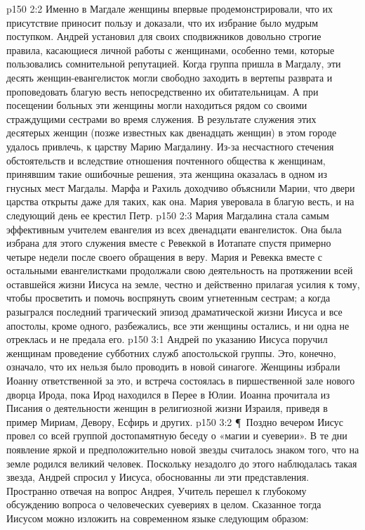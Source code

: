 \vs p150 2:2 Именно в Магдале женщины впервые продемонстрировали, что их присутствие приносит пользу и доказали, что их избрание было мудрым поступком. Андрей установил для своих сподвижников довольно строгие правила, касающиеся личной работы с женщинами, особенно теми, которые пользовались сомнительной репутацией. Когда группа пришла в Магдалу, эти десять женщин\hyp{}евангелисток могли свободно заходить в вертепы разврата и проповедовать благую весть непосредственно их обитательницам. А при посещении больных эти женщины могли находиться рядом со своими страждущими сестрами во время служения. В результате служения этих десятерых женщин (позже известных как двенадцать женщин) в этом городе удалось привлечь, к царству Марию Магдалину. Из\hyp{}за несчастного стечения обстоятельств и вследствие отношения почтенного общества к женщинам, принявшим такие ошибочные решения, эта женщина оказалась в одном из гнусных мест Магдалы. Марфа и Рахиль доходчиво объяснили Марии, что двери царства открыты даже для таких, как она. Мария уверовала в благую весть, и на следующий день ее крестил Петр.
\vs p150 2:3 Мария Магдалина стала самым эффективным учителем евангелия из всех двенадцати евангелисток. Она была избрана для этого служения вместе с Ревеккой в Иотапате спустя примерно четыре недели после своего обращения в веру. Мария и Ревекка вместе с остальными евангелистками продолжали свою деятельность на протяжении всей оставшейся жизни Иисуса на земле, честно и действенно прилагая усилия к тому, чтобы просветить и помочь воспрянуть своим угнетенным сестрам; а когда разыгрался последний трагический эпизод драматической жизни Иисуса и все апостолы, кроме одного, разбежались, все эти женщины остались, и ни одна не отреклась и не предала его.
\vs p150 3:1 Андрей по указанию Иисуса поручил женщинам проведение субботних служб апостольской группы. Это, конечно, означало, что их нельзя было проводить в новой синагоге. Женщины избрали Иоанну ответственной за это, и встреча состоялась в пиршественной зале нового дворца Ирода, пока Ирод находился в Перее в Юлии. Иоанна прочитала из Писания о деятельности женщин в религиозной жизни Израиля, приведя в пример Мириам, Девору, Есфирь и других.
\vs p150 3:2 \P\ Поздно вечером Иисус провел со всей группой достопамятную беседу о «магии и суеверии». В те дни появление яркой и предположительно новой звезды считалось знаком того, что на земле родился великий человек. Поскольку незадолго до этого наблюдалась такая звезда, Андрей спросил у Иисуса, обоснованны ли эти представления. Пространно отвечая на вопрос Андрея, Учитель перешел к глубокому обсуждению вопроса о человеческих суевериях в целом. Сказанное тогда Иисусом можно изложить на современном языке следующим образом:
